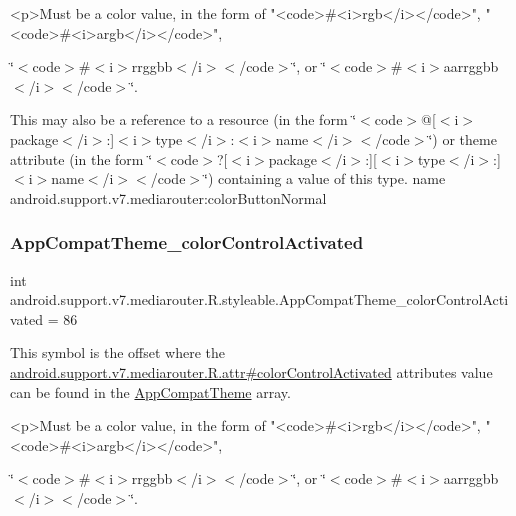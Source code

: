 \begin{DoxyVerb}      <p>Must be a color value, in the form of "<code>#<i>rgb</i></code>", "<code>#<i>argb</i></code>",
\end{DoxyVerb}
 \char`\"{}$<$code$>$\#$<$i$>$rrggbb$<$/i$>$$<$/code$>$\char`\"{}, or \char`\"{}$<$code$>$\#$<$i$>$aarrggbb$<$/i$>$$<$/code$>$\char`\"{}. 

This may also be a reference to a resource (in the form \char`\"{}$<$code$>$@\mbox{[}$<$i$>$package$<$/i$>$\+:\mbox{]}$<$i$>$type$<$/i$>$\+:$<$i$>$name$<$/i$>$$<$/code$>$\char`\"{}) or theme attribute (in the form \char`\"{}$<$code$>$?\mbox{[}$<$i$>$package$<$/i$>$\+:\mbox{]}\mbox{[}$<$i$>$type$<$/i$>$\+:\mbox{]}$<$i$>$name$<$/i$>$$<$/code$>$\char`\"{}) containing a value of this type.  name android.\+support.\+v7.\+mediarouter\+:color\+Button\+Normal \mbox{\label{classandroid_1_1support_1_1v7_1_1mediarouter_1_1R_1_1styleable_a4af1f042778d9a39c7755e8d349bfbe2}} 
\subsubsection{\texorpdfstring{App\+Compat\+Theme\+\_\+color\+Control\+Activated}{AppCompatTheme\_colorControlActivated}}
{\footnotesize\ttfamily int android.\+support.\+v7.\+mediarouter.\+R.\+styleable.\+App\+Compat\+Theme\+\_\+color\+Control\+Activated = 86\hspace{0.3cm}{\ttfamily [static]}}

This symbol is the offset where the \hyperlink{classandroid_1_1support_1_1v7_1_1mediarouter_1_1R_1_1attr_af0b9256d1a94dcf2b3984484a9028082}{android.\+support.\+v7.\+mediarouter.\+R.\+attr\#color\+Control\+Activated} attribute\textquotesingle{}s value can be found in the \hyperlink{classandroid_1_1support_1_1v7_1_1mediarouter_1_1R_1_1styleable_a4e3d3900c75d49aeb2f283cac00214d6}{App\+Compat\+Theme} array.

\begin{DoxyVerb}      <p>Must be a color value, in the form of "<code>#<i>rgb</i></code>", "<code>#<i>argb</i></code>",
\end{DoxyVerb}
 \char`\"{}$<$code$>$\#$<$i$>$rrggbb$<$/i$>$$<$/code$>$\char`\"{}, or \char`\"{}$<$code$>$\#$<$i$>$aarrggbb$<$/i$>$$<$/code$>$\char`\"{}. 

